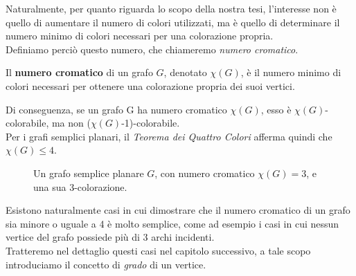 \documentclass[a4paper,12pt,titlepage]{report}
\begin{document}
	Naturalmente, per quanto riguarda lo scopo della nostra tesi, l'interesse non è quello di aumentare il numero di colori utilizzati, ma è quello di determinare il numero minimo di colori necessari per una colorazione propria.
	\\Definiamo perciò questo numero, che chiameremo \emph{numero cromatico}. 
	\begin{dfn}
		Il {\bfseries numero cromatico} di un grafo $G$, denotato $\chi(G)$, è il numero minimo di colori necessari per ottenere una colorazione propria dei suoi vertici. 
	\end{dfn}
	\noindent Di conseguenza, se un grafo G ha numero cromatico $\chi(G)$, esso è $\chi(G)$-colorabile, ma non ($\chi(G)$-1)-colorabile. 
	\\Per i grafi semplici planari, il \emph{Teorema dei Quattro Colori} afferma quindi che $\chi(G) \leq 4$.
	\clearpage
	\begin{figure}[h]
		\centering
	    \vspace{0.5cm}
	    \caption{Un grafo semplice planare $G$, con numero cromatico $\chi(G) = 3$, e una sua 3-colorazione.}
    \end{figure}
	Esistono naturalmente casi in cui dimostrare che il numero cromatico di un grafo sia minore o uguale a 4 è molto semplice, come ad esempio i casi in cui nessun vertice del grafo possiede più di 3 archi incidenti.
	\\Tratteremo nel dettaglio questi casi nel capitolo successivo, a tale scopo introduciamo il concetto di \emph{grado} di un vertice.
			
\end{document}
